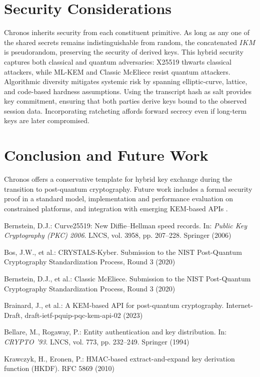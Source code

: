 \documentclass[runningheads]{llncs}
\begin{document}
\section{Security Considerations}
Chronos inherits security from each constituent primitive. As long as any one of the shared secrets remains indistinguishable from random, the concatenated \(\mathit{IKM}\) is pseudorandom, preserving the security of derived keys. This hybrid security captures both classical and quantum adversaries: X25519 thwarts classical attackers, while ML-KEM and Classic McEliece resist quantum attackers. Algorithmic diversity mitigates systemic risk by spanning elliptic-curve, lattice, and code-based hardness assumptions. Using the transcript hash as salt provides key commitment, ensuring that both parties derive keys bound to the observed session data. Incorporating ratcheting affords forward secrecy even if long-term keys are later compromised.

\section{Conclusion and Future Work}
Chronos offers a conservative template for hybrid key exchange during the transition to post-quantum cryptography. Future work includes a formal security proof in a standard model, implementation and performance evaluation on constrained platforms, and integration with emerging KEM-based APIs \cite{brainard2023kemapi}.

\begin{thebibliography}{8}
Bernstein, D.J.: Curve25519: New Diffie--Hellman speed records. In: \emph{Public Key Cryptography (PKC) 2006}. LNCS, vol. 3958, pp. 207--228. Springer (2006)

Bos, J.W., et al.: CRYSTALS-Kyber. Submission to the NIST Post-Quantum Cryptography Standardization Process, Round 3 (2020)

Bernstein, D.J., et al.: Classic McEliece. Submission to the NIST Post-Quantum Cryptography Standardization Process, Round 3 (2020)

Brainard, J., et al.: A KEM-based API for post-quantum cryptography. Internet-Draft, draft-ietf-pquip-pqc-kem-api-02 (2023)

Bellare, M., Rogaway, P.: Entity authentication and key distribution. In: \emph{CRYPTO '93}. LNCS, vol. 773, pp. 232--249. Springer (1994)

Krawczyk, H., Eronen, P.: HMAC-based extract-and-expand key derivation function (HKDF). RFC 5869 (2010)

\end{thebibliography}
\end{document}
